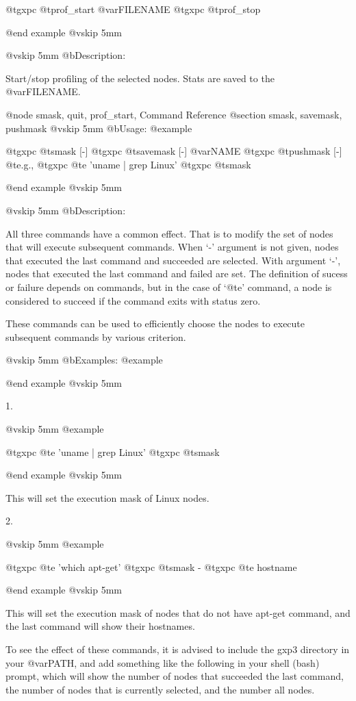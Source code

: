   @t{gxpc} @t{prof_start} @var{FILENAME}
  @t{gxpc} @t{prof_stop}

@end example
@vskip 5mm

@vskip 5mm
@b{Description:}


  Start/stop profiling of the selected nodes. Stats are saved to
the @var{FILENAME}.

@node smask, quit, prof_start, Command Reference
@section smask, savemask, pushmask
@vskip 5mm
@b{Usage:}
@example

  @t{gxpc} @t{smask}    [-]
  @t{gxpc} @t{savemask} [-] @var{NAME}
  @t{gxpc} @t{pushmask} [-]
  @t{e}.g.,
  @t{gxpc}  @t{e}  'uname | grep Linux'
  @t{gxpc}  @t{smask}

@end example
@vskip 5mm

@vskip 5mm
@b{Description:}


  All three commands have a common effect. That is to modify the
set of nodes that will execute subsequent commands.  When `-'
argument is not given, nodes that executed the last command and
succeeded are selected. With argument `-', nodes that executed
the last command and failed are set. The definition of sucess or
failure depends on commands, but in the case of `@t{e}' command, a
node is considered to succeed if the command exits with status
zero.

These commands can be used to efficiently choose the nodes
to execute subsequent commands by various criterion.

@vskip 5mm
@b{Examples:}
@example


@end example
@vskip 5mm

1.

@vskip 5mm
@example

  @t{gxpc}  @t{e}  'uname | grep Linux'
  @t{gxpc}  @t{smask}

@end example
@vskip 5mm

This will set the execution mask of Linux nodes.

2.

@vskip 5mm
@example

  @t{gxpc}  @t{e}  'which apt-get'
  @t{gxpc}  @t{smask}  -
  @t{gxpc}  @t{e}  hostname

@end example
@vskip 5mm

This will set the execution mask of nodes that do not have apt-get
command, and the last command will show their hostnames.

To see the effect of these commands, it is advised to include the
gxp3 directory in your @var{PATH}, and add something like the following
in your shell (bash) prompt, which will show the number of nodes
that succeeded the last command, the number of nodes that is
currently selected, and the number all nodes.

